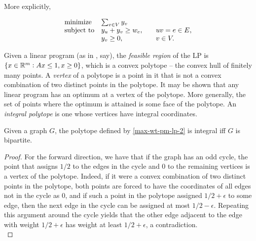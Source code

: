 	More explicitly,

	\[
	\begin{array}{ll@{}ll}
	\text{minimize}  & \sum_{v \in V} y_v &\\
	\text{subject to}& \displaystyle y_u + y_v \ge w_e, & \qquad uv = e \in E, \\
	                 & y_v \ge 0, & \qquad v \in V.
	\end{array}
	\]

	Given a linear program (as in , say), the \emph{feasible region} of the LP is $\{x \in \mathbb{R}^m : Ax \le 1, x \ge 0\}$, which is a convex polytope -- the convex hull of finitely many points. A \emph{vertex} of a polytope is a point in it that is not a convex combination of two distinct points in the polytope. It may be shown that any linear program has an optimum at a vertex of the polytope. More generally, the set of points where the optimum is attained is some face of the polytope. An \emph{integral polytope} is one whose vertices have integral coordinates.\\

	\begin{fdef}
		Given a graph $G$, the polytope defined by \eqref{max-wt-pm-lp-2} is integral iff $G$ is bipartite.
	\end{fdef}
	\begin{proof}
		For the forward direction, we have that if the graph has an odd cycle, the point that assigns $1/2$ to the edges in the cycle and $0$ to the remaining vertices is a vertex of the polytope. Indeed, if it were a convex combination of two distinct points in the polytope, both points are forced to have the coordinates of all edges not in the cycle as $0$, and if such a point in the polytope assigned $1/2+\epsilon$ to some edge, then the next edge in the cycle can be assigned at most $1/2-\epsilon$. Repeating this argument around the cycle yields that the other edge adjacent to the edge with weight $1/2+\epsilon$ has weight at least $1/2+\epsilon$, a contradiction. \\
	\end{proof}

